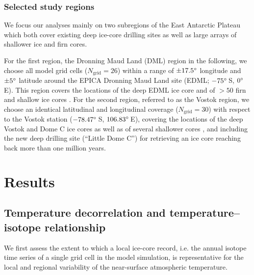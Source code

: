 \documentclass[cp, manuscript, draft]{copernicus}
\begin{document}
\subsubsection{Selected study regions}\label{methods:regions}

We focus our analyses mainly on two subregions of the East Antarctic Plateau
which both cover existing deep ice-core drilling sites as well as large arrays
of shallower ice and firn cores.

For the first region, the Dronning Maud Land (DML) region in the following, we
choose all model grid cells ($N_{\mathrm{grid}}=26$) within a range of
$\pm17.5^{\circ}$ longitude and $\pm5^{\circ}$ latitude around the EPICA Dronning
Maud Land site (EDML; $-75^{\circ}$\,S, $0^{\circ}$\,E). This region covers the
locations of the deep EDML ice core \citep{EPICAcommunitymembers2006} and of
$>50$ firn and shallow ice cores \citep{Altnau2015}. For the second region,
referred to as the Vostok region, we choose an identical latitudinal and
longitudinal coverage ($N_{\mathrm{grid}}=30$) with respect to the Vostok
station ($-78.47^{\circ}$\,S, $106.83^{\circ}$\,E), covering the locations of the
deep Vostok and Dome C ice cores as well as of several shallower cores
\citep{Stenni2017}, and including the new deep drilling site (``Little Dome C'')
for retrieving an ice core reaching back more than one million years.

\section{Results}\label{results}

\subsection{Temperature decorrelation and temperature--isotope relationship}
\label{results:t2m-iso}

We first assess the extent to which a local ice-core record, i.e. the annual
isotope time series of a single grid cell in the model simulation, is
representative for the local and regional variability of the near-surface
atmospheric temperature.
\end{document}
